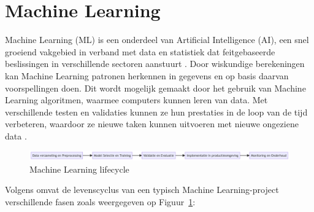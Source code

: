 
\section{Machine Learning}

Machine Learning (ML) is een onderdeel van Artificial Intelligence (AI), een snel groeiend vakgebied in verband met data en statistiek dat feitgebaseerde beslissingen in verschillende sectoren aanstuurt \autocite{Jordan2015}. Door wiskundige berekeningen kan Machine Learning patronen herkennen in gegevens en op basis daarvan voorspellingen doen. Dit wordt mogelijk gemaakt door het gebruik van Machine Learning algoritmen, waarmee computers kunnen leren van data. Met verschillende testen en validaties kunnen ze hun prestaties in de loop van de tijd verbeteren, waardoor ze nieuwe taken kunnen uitvoeren met nieuwe ongeziene data \autocite{Shaveta2023}.\newline

\begin{figure}[h]
    \includegraphics[width=\linewidth]{graphics/mlcycle.png}
    \caption{Machine Learning lifecycle}
    \label{fig:ML_cycle}
\end{figure}

Volgens \textcite{Schlegel2022} omvat de levenscyclus van een typisch Machine Learning-project verschillende fasen zoals weergegeven op Figuur~\ref{fig:ML_cycle}:

